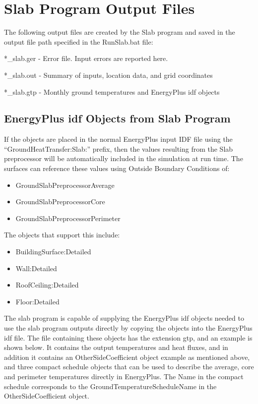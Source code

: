 \section{Slab Program Output Files}\label{slab-program-output-files}

The following output files are created by the Slab program and saved in the output file path specified in the RunSlab.bat file:

*\_slab.ger - Error file. Input errors are reported here.

*\_slab.out - Summary of inputs, location data, and grid coordinates

*\_slab.gtp - Monthly ground temperatures and EnergyPlus idf objects

\subsection{EnergyPlus idf Objects from Slab Program}\label{energyplus-idf-objects-from-slab-program}

If the objects are placed in the normal EnergyPlus input IDF file using the ``GroundHeatTransfer:Slab:'' prefix, then the values resulting from the Slab preprocessor will be automatically included in the simulation at run time. The surfaces can reference these values using Outside Boundary Conditions of:

\begin{itemize}
\item
  GroundSlabPreprocessorAverage
\item
  GroundSlabPreprocessorCore
\item
  GroundSlabPreprocessorPerimeter
\end{itemize}

The objects that support this include:

\begin{itemize}
\item
  BuildingSurface:Detailed
\item
  Wall:Detailed
\item
  RoofCeiling:Detailed
\item
  Floor:Detailed
\end{itemize}

The slab program is capable of supplying the EnergyPlus idf objects needed to use the slab program outputs directly by copying the objects into the EnergyPlus idf file. The file containing these objects has the extension gtp, and an example is shown below. It contains the output temperatures and heat fluxes, and in addition it contains an OtherSideCoefficient object example as mentioned above, and three compact schedule objects that can be used to describe the average, core and perimeter temperatures directly in EnergyPlus. The Name in the compact schedule corresponds to the GroundTemperatureScheduleName in the OtherSideCoefficient object.

